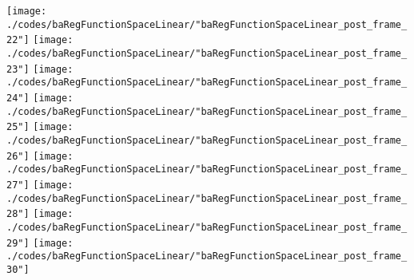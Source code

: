 \begin{frame}{\insertsection}
\begin{center}
{\begin{animateinline}{20}
				 \texttt{[image: ./codes/baRegFunctionSpaceLinear/"baRegFunctionSpaceLinear\_post\_frame\_22"]}\newframe
				 \texttt{[image: ./codes/baRegFunctionSpaceLinear/"baRegFunctionSpaceLinear\_post\_frame\_23"]}\newframe
				 \texttt{[image: ./codes/baRegFunctionSpaceLinear/"baRegFunctionSpaceLinear\_post\_frame\_24"]}\newframe
				 \texttt{[image: ./codes/baRegFunctionSpaceLinear/"baRegFunctionSpaceLinear\_post\_frame\_25"]}\newframe
				 \texttt{[image: ./codes/baRegFunctionSpaceLinear/"baRegFunctionSpaceLinear\_post\_frame\_26"]}\newframe
				 \texttt{[image: ./codes/baRegFunctionSpaceLinear/"baRegFunctionSpaceLinear\_post\_frame\_27"]}\newframe
				 \texttt{[image: ./codes/baRegFunctionSpaceLinear/"baRegFunctionSpaceLinear\_post\_frame\_28"]}\newframe
				 \texttt{[image: ./codes/baRegFunctionSpaceLinear/"baRegFunctionSpaceLinear\_post\_frame\_29"]}\newframe
				 \texttt{[image: ./codes/baRegFunctionSpaceLinear/"baRegFunctionSpaceLinear\_post\_frame\_30"]}
			 \end{animateinline}
			}
	\end{center}
    
\end{frame}

